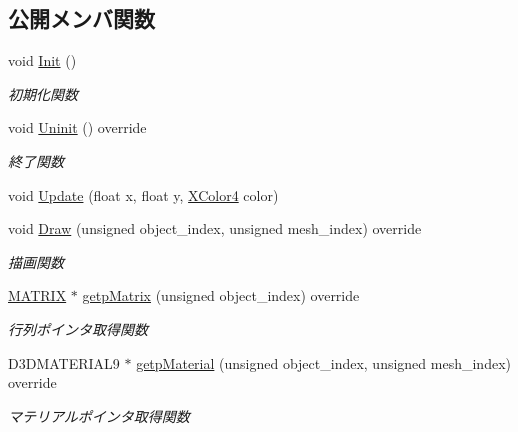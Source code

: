 \subsection*{公開メンバ関数}
\begin{DoxyCompactItemize}
\item 
void \mbox{\hyperlink{class_render_texture_a498eb8be8672e01164b3770cdff43291}{Init}} ()
\begin{DoxyCompactList}\small\item\em 初期化関数 \end{DoxyCompactList}\item 
void \mbox{\hyperlink{class_render_texture_a0e55cd9b412d87dfe1f4b90f29f357c8}{Uninit}} () override
\begin{DoxyCompactList}\small\item\em 終了関数 \end{DoxyCompactList}\item 
void \mbox{\hyperlink{class_render_texture_ac27f8cfac7903dd502de61e22abfc457}{Update}} (float x, float y, \mbox{\hyperlink{_vector3_d_8h_a680c30c4a07d86fe763c7e01169cd6cc}{X\+Color4}} color)
\item 
void \mbox{\hyperlink{class_render_texture_a529ab829c676470ae5764b42cba9efb0}{Draw}} (unsigned object\+\_\+index, unsigned mesh\+\_\+index) override
\begin{DoxyCompactList}\small\item\em 描画関数 \end{DoxyCompactList}\item 
\mbox{\hyperlink{_vector3_d_8h_a032295cd9fb1b711757c90667278e744}{M\+A\+T\+R\+IX}} $\ast$ \mbox{\hyperlink{class_render_texture_adafb7e9aeea3c298cbfcc71e35ed9457}{getp\+Matrix}} (unsigned object\+\_\+index) override
\begin{DoxyCompactList}\small\item\em 行列ポインタ取得関数 \end{DoxyCompactList}\item 
D3\+D\+M\+A\+T\+E\+R\+I\+A\+L9 $\ast$ \mbox{\hyperlink{class_render_texture_a1defe8bfacccf91dc7479a977e70578c}{getp\+Material}} (unsigned object\+\_\+index, unsigned mesh\+\_\+index) override
\begin{DoxyCompactList}\small\item\em マテリアルポインタ取得関数 \end{DoxyCompactList}\end{DoxyCompactItemize}
